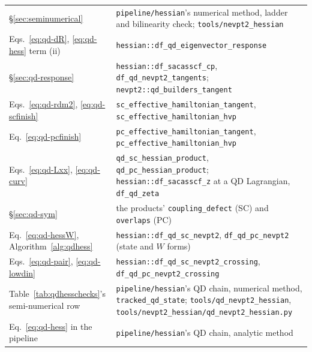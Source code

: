 \documentclass[11pt]{article}
\newcommand{\code}[1]{\texttt{#1}}
\begin{document}
\begin{center}
\begin{tabularx}{\linewidth}{@{}l>{\raggedright\arraybackslash}X@{}}
\S\ref{sec:seminumerical} & \code{pipeline/hessian}'s numerical method, ladder and bilinearity check; \code{tools/nevpt2\_hessian} \\
Eqs.~\eqref{eq:qd-dR}, \eqref{eq:qd-hess} term (ii) & \code{hessian::df\_qd\_eigenvector\_response} \\
\S\ref{sec:qd-response} & \code{hessian::df\_sacasscf\_cp}, \code{df\_qd\_nevpt2\_tangents}; \code{nevpt2::qd\_builders\_tangent} \\
Eqs.~\eqref{eq:qd-rdm2}, \eqref{eq:qd-scfinish} & \code{sc\_effective\_hamiltonian\_tangent}, \code{sc\_effective\_hamiltonian\_hvp} \\
Eq.~\eqref{eq:qd-pcfinish} & \code{pc\_effective\_hamiltonian\_tangent}, \code{pc\_effective\_hamiltonian\_hvp} \\
Eqs.~\eqref{eq:qd-Lxx}, \eqref{eq:qd-curv} & \code{qd\_sc\_hessian\_product}, \code{qd\_pc\_hessian\_product}; \code{hessian::df\_sacasscf\_z} at a QD Lagrangian, \code{df\_qd\_zeta} \\
\S\ref{sec:qd-sym} & the products' \code{coupling\_defect} (SC) and \code{overlaps} (PC) \\
Eq.~\eqref{eq:qd-hessW}, Algorithm~\ref{alg:qdhess} & \code{hessian::df\_qd\_sc\_nevpt2}, \code{df\_qd\_pc\_nevpt2} (state and $W$ forms) \\
Eqs.~\eqref{eq:qd-pair}, \eqref{eq:qd-lowdin} & \code{hessian::df\_qd\_sc\_nevpt2\_crossing}, \code{df\_qd\_pc\_nevpt2\_crossing} \\
Table~\ref{tab:qdhesschecks}'s semi-numerical row & \code{pipeline/hessian}'s QD chain, numerical method, \code{tracked\_qd\_state}; \code{tools/qd\_nevpt2\_hessian}, \code{tools/nevpt2\_hessian/qd\_nevpt2\_hessian.py} \\
Eq.~\eqref{eq:qd-hess} in the pipeline & \code{pipeline/hessian}'s QD chain, analytic method \\
\bottomrule
\end{tabularx}
\end{center}
\end{document}
